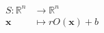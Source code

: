 \documentclass[preview]{standalone}
\begin{document}
\begin{center}
\begin{align*}
                S\colon\mathbb{R}^n&\rightarrow\mathbb{R}^n\\
                \mathbf{x}&\mapsto r O(\mathbf{x}) + b
            \end{align*}
\end{center}
\end{document}
